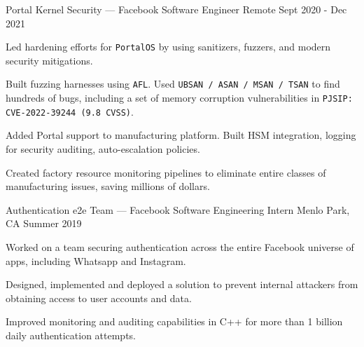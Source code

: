 \begin{cventries}
\cventry
{Portal Kernel Security — Facebook} %
{Software Engineer} %
{Remote} %
{Sept 2020 - Dec 2021} %
{
	\begin{cvitems} %
		\item {Led hardening efforts for \texttt{PortalOS} by using sanitizers, fuzzers, and modern security mitigations.} 
		\item {Built fuzzing harnesses using \texttt{AFL}. Used \texttt{UBSAN / ASAN / MSAN / TSAN} to find hundreds of bugs, including a set of memory corruption vulnerabilities in \texttt{PJSIP: CVE-2022-39244 (9.8 CVSS)}.}
		\item {Added Portal support to manufacturing platform. Built HSM integration, logging for security auditing, auto-escalation policies.}
		\item {Created factory resource monitoring pipelines to eliminate entire classes of manufacturing issues, saving millions of dollars.}
	\end{cvitems}
}
\cventry
{Authentication e2e Team — Facebook} %
{Software Engineering Intern} %
{Menlo Park, CA} %
{Summer 2019} %
{
	\begin{cvitems} %
		\item {Worked on a team securing authentication across the entire Facebook universe of apps, including Whatsapp and Instagram.}
		\item {Designed, implemented and deployed a solution to prevent internal attackers from obtaining access to user accounts and data.}
		\item {Improved monitoring and auditing capabilities in C++ for more than 1 billion daily authentication attempts.}
	\end{cvitems}
}

\end{cventries}
